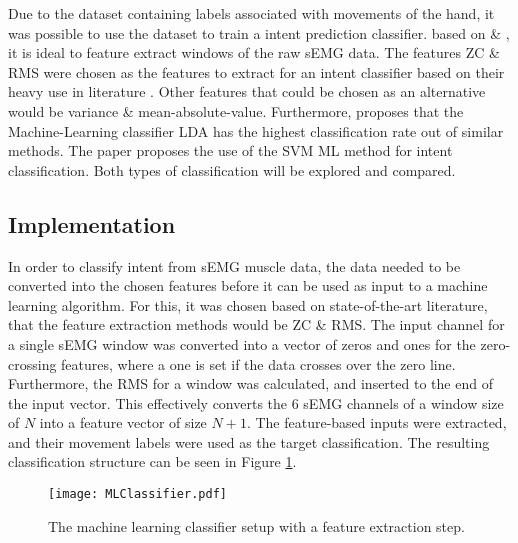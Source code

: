 \documentclass[../main.tex]{subfiles}
\begin{document}
Due to the dataset containing labels associated with movements of the hand, it was possible to use the dataset to train a intent prediction classifier.
based on \cite{Yuki2023} \& \cite{Batzianoulis2018}, it is ideal to feature extract windows of the raw sEMG data.
The features \gls{ZC} \& \gls{RMS} were chosen as the features to extract for an intent classifier based on their heavy use in literature \cite{Tech2015}.
Other features that could be chosen as an alternative would be variance \& mean-absolute-value.
Furthermore, \cite{YanchaoWang2022} proposes that the Machine-Learning classifier LDA has the highest classification rate out of similar methods.
The paper \cite{Batzianoulis2018} proposes the use of the \gls{SVM} \gls{ML} method for intent classification.
Both types of classification will be explored and compared.

\subsection{Implementation}

In order to classify intent from sEMG muscle data, the data needed to be converted into the chosen features before it can be used as input to a machine learning algorithm.
For this, it was chosen based on state-of-the-art literature, that the feature extraction methods would be \gls{ZC} \& \gls{RMS}.
The input channel for a single sEMG window was converted into a vector of zeros and ones for the zero-crossing features, where a one is set if the data crosses over the zero line.
Furthermore, the RMS for a window was calculated, and inserted to the end of the input vector. This effectively converts the 6 sEMG channels of a window size of $N$ into a feature vector of size $N+1$.
The feature-based inputs were extracted, and their movement labels were used as the target classification.
The resulting classification structure can be seen in Figure \ref{fig:mlclassifier}.

\begin{figure}[H]
\begin{center}
\texttt{[image: MLClassifier.pdf]}
\caption{The machine learning classifier setup with a feature extraction step.}
\label{fig:mlclassifier}
\end{center}
\end{figure}
\end{document}
